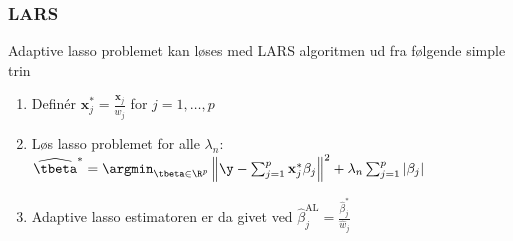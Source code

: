 \subsubsection{LARS}
Adaptive lasso problemet kan løses med LARS algoritmen ud fra følgende simple trin
\begin{enumerate}
\item Definér \(\mathbf{x}_j^{*} = \frac{\mathbf{x}_j}{\widehat{w}_j}\) for \(j=1, \ldots, p\)
\item Løs lasso problemet for alle \(\lambda_n\): \(\widehat{\tbeta}^{*} = \argmin_{\tbeta \in \R^p} \left\Vert \y - \sum_{j=1}^p \mathbf{x}_j^{*} \beta_j \right\Vert^2 + \lambda_n \sum_{j=1}^p \vert \beta_j \vert\)
\item Adaptive lasso estimatoren er da givet ved \(\widehat{\beta}_j^{\text{AL}} = \frac{\widehat{\beta}_j^{*}}{\widehat{w}_j}\)
\end{enumerate}
%
%